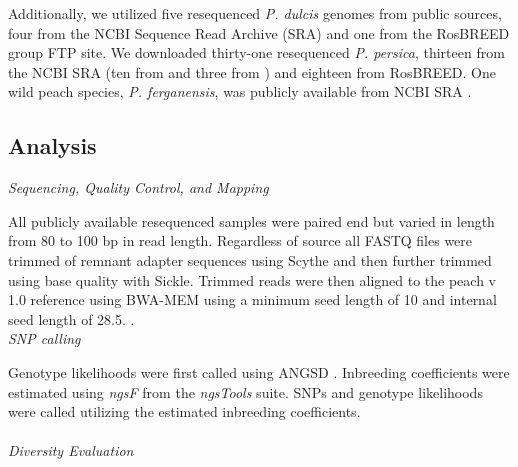 \documentclass[12pt]{article}
\begin{document}
Additionally, we utilized five resequenced \emph{P. dulcis} genomes from public sources, four from \citealt{koepke2013comparative} 
the NCBI Sequence Read Archive (SRA) and one from the RosBREED group FTP site.
%
We downloaded thirty-one resequenced \emph{P. persica}, thirteen from the NCBI SRA (ten from \citealt{verde2013high} and three from \citealt{ahmad2011whole}) and eighteen from RosBREED.
%
One wild peach species, \emph{P. ferganensis}, was publicly available from NCBI SRA \citep{verde2013high}.\\
%
%
\subsection*{Analysis}
\emph{Sequencing, Quality Control, and Mapping}

All publicly available resequenced samples were paired end but varied in length from 80 to 100 bp in read length. 
%
Regardless of source all FASTQ files were trimmed of remnant adapter sequences using Scythe and then further trimmed using base quality with Sickle. 
%
%
%
Trimmed reads were then aligned to the peach v 1.0 reference using BWA-MEM using a minimum seed length of 10 and internal seed length of 28.5.
%
 \citep{li2013aligning}. 
%
\\
\emph{SNP calling}

%
%
%
Genotype likelihoods were first called using ANGSD \citep{korneliussen2014angsd}.
%
Inbreeding coefficients were estimated using \emph{ngsF} from the \emph{ngsTools} \citep{fumagalli2014ngstools} suite.
%
SNPs and genotype likelihoods were called utilizing the estimated inbreeding coefficients.
\\
%
\\
\emph{Diversity Evaluation}
\end{document}
